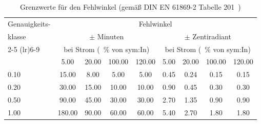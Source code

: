 \begin{table}[H]
    \centering
    \caption[Grenzwerte für den Fehlwinkel]{Grenzwerte für den Fehlwinkel (gemäß DIN EN 61869-2 Tabelle 201~\cite[S.~22]{norm-DIN_EN_61869_2-Messwandler_Teil2-DIN})}
    \label{tab:fehlwinkel}
    \begin{tabular}{lcccccccc}
        \toprule
        Genauigkeits- & \multicolumn{8}{c}{Fehlwinkel}                                                                                                                                                                                             \\
        klasse        & \multicolumn{4}{c}{$\pm$ Minuten}                                & \multicolumn{4}{c}{$\pm$ Zentiradiant}                                                                                                                  \\
        \cmidrule(lr){2-5} \cmidrule(lr){6-9}
                      & \multicolumn{4}{c}{bei Strom (\SI{}{\percent} von \gls{sym:In})} & \multicolumn{4}{c}{bei Strom (\SI{}{\percent} von \gls{sym:In})}                                                                                        \\
                      & \num{5,00}                                                       & \num{20,00}                                                      & \num{100,00} & \num{120,00} & \num{5,00} & \num{20,00} & \num{100,00} & \num{120,00} \\
        \midrule
        \num{0,10}    & \num{15,00}                                                      & \num{8,00}                                                       & \num{5,00}   & \num{5,00}   & \num{0,45} & \num{0,24}  & \num{0,15}   & \num{0,15}   \\
        \num{0,20}    & \num{30,00}                                                      & \num{15,00}                                                      & \num{10,00}  & \num{10,00}  & \num{0,90} & \num{0,45}  & \num{0,30}   & \num{0,30}   \\
        \num{0,50}    & \num{90,00}                                                      & \num{45,00}                                                      & \num{30,00}  & \num{30,00}  & \num{2,70} & \num{1,35}  & \num{0,90}   & \num{0,90}   \\
        \num{1,00}    & \num{180,00}                                                     & \num{90,00}                                                      & \num{60,00}  & \num{60,00}  & \num{5,40} & \num{2,70}  & \num{1,80}   & \num{1,80}   \\
        \bottomrule
    \end{tabular}
\end{table}

